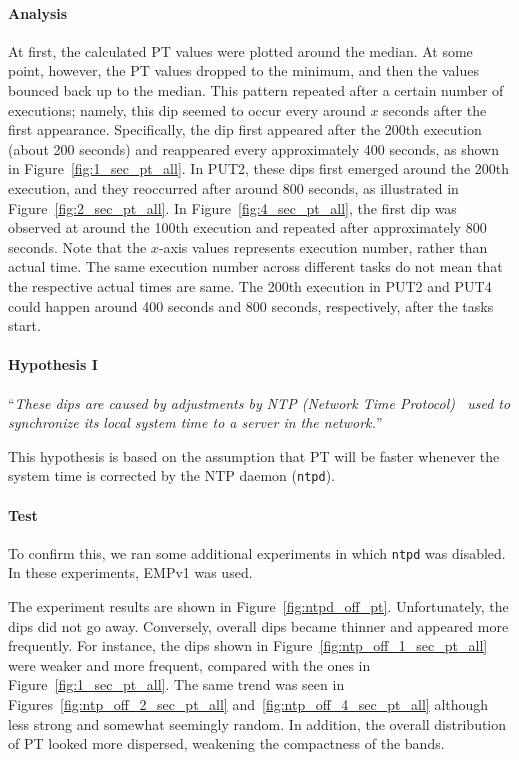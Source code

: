 \documentclass[10pt]{article}
\begin{document}
\paragraph{Analysis}
At first, the calculated PT values were plotted around the median. 
At some point, however, the PT values dropped to the minimum, 
and then the values bounced back up to the median. 
This pattern repeated after a certain number of executions; 
namely, this dip seemed to occur every around $x$ seconds after the first appearance. 
Specifically, the dip first appeared after the 200th execution (about 200 seconds) and 
reappeared every approximately 400 seconds, as shown in Figure~\ref{fig:1_sec_pt_all}.
In PUT2, these dips first emerged around the 200th execution, 
and they reoccurred after around 800 seconds, as illustrated in Figure~\ref{fig:2_sec_pt_all}.
In Figure~\ref{fig:4_sec_pt_all}, 
the first dip was observed at around the 100th execution and repeated after approximately 800 seconds. 
Note that the $x$-axis values represents execution number, rather than actual time.
The same execution number across different tasks do not mean that the respective actual times are same. 
The 200th execution in PUT2 and PUT4 could happen around 400 seconds and 800 seconds, respectively, after the tasks start.

\paragraph{Hypothesis I} ``{\it These dips are caused by adjustments by NTP (Network Time Protocol)~\cite{Mills} used to 
synchronize its local system time to a server in the network.}''

This hypothesis is based on the assumption that PT will be faster whenever the system time is corrected 
by the NTP daemon ({\tt ntpd}). 

\paragraph{Test} To confirm this, we ran some additional experiments in which {\tt ntpd} was disabled.
In these experiments, EMPv1 was used. 

The experiment results are shown in Figure~\ref{fig:ntpd_off_pt}. 
Unfortunately, the dips did not go away. 
Conversely, overall dips became thinner and appeared more frequently. 
For instance, the dips shown in Figure~\ref{fig:ntp_off_1_sec_pt_all} were weaker and more frequent, 
compared with the ones in Figure~\ref{fig:1_sec_pt_all}. 
The same trend was seen in Figures~\ref{fig:ntp_off_2_sec_pt_all} and~\ref{fig:ntp_off_4_sec_pt_all} although less strong and somewhat seemingly random. 
In addition, the overall distribution of PT looked more dispersed, weakening the compactness of the bands.
\end{document}
